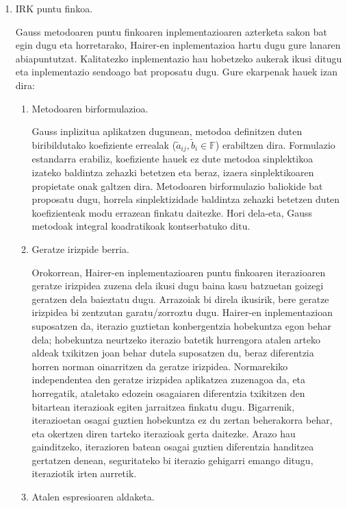 \begin{enumerate}
\item IRK puntu finkoa.

Gauss metodoaren puntu finkoaren inplementazioaren azterketa sakon bat egin dugu eta horretarako, Hairer-en inplementazioa \cite{Hairer2008} hartu dugu gure lanaren abiapuntutzat. Kalitatezko inplementazio hau hobetzeko aukerak ikusi ditugu eta inplementazio sendoago bat proposatu dugu. Gure ekarpenak hauek izan dira:  

\begin{enumerate}
\item Metodoaren birformulazioa.

Gauss inplizitua aplikatzen dugunean, metodoa definitzen duten biribildutako koefiziente errealak ($\tilde{a}_{ij}, \tilde{b}_i \in \mathbb{F}$) erabiltzen dira. Formulazio estandarra erabiliz, koefiziente hauek ez dute metodoa sinplektikoa izateko baldintza zehazki betetzen eta beraz, izaera sinplektikoaren propietate onak galtzen dira. Metodoaren birformulazio baliokide bat proposatu dugu, horrela sinplektizidade baldintza zehazki betetzen duten koefizienteak modu errazean finkatu daitezke. Hori dela-eta, Gauss metodoak integral koadratikoak kontserbatuko ditu.

\item Geratze irizpide berria.

Orokorrean, Hairer-en inplementazioaren puntu finkoaren iterazioaren geratze irizpidea zuzena dela ikusi dugu baina kasu batzuetan goizegi geratzen dela baieztatu dugu. Arrazoiak bi direla ikusirik, bere geratze irizpidea bi zentzutan garatu/zorroztu dugu. Hairer-en inplementazioan suposatzen da, iterazio guztietan konbergentzia hobekuntza egon behar dela; hobekuntza neurtzeko iterazio batetik hurrengora atalen arteko aldeak txikitzen joan behar dutela suposatzen du, beraz diferentzia horren norman oinarritzen da geratze irizpidea. 
Normarekiko independentea den geratze irizpidea aplikatzea zuzenagoa da, eta horregatik, ataletako edozein osagaiaren diferentzia txikitzen den bitartean iterazioak egiten jarraitzea finkatu dugu. Bigarrenik, iterazioetan osagai guztien hobekuntza ez du zertan beherakorra behar, eta okertzen diren tarteko iterazioak gerta daitezke. Arazo hau gainditzeko, iterazioren batean osagai guztien diferentzia handitzea gertatzen denean, seguritateko bi iterazio gehigarri emango ditugu, iteraziotik irten aurretik.   

\item Atalen espresioaren aldaketa.


\end{enumerate}
\end{enumerate}
